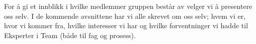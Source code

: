 For å gi et innblikk i hvilke medlemmer gruppen består av velger vi å presentere oss selv.
I de kommende avsnittene har vi alle skrevet om oss selv; hvem vi er, hvor vi kommer fra, hvilke interesser vi har og hvilke forventninger vi hadde til Eksperter i Team (både til fag og prosess).